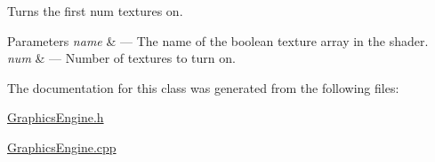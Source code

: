 Turns the first num textures on. 


\begin{DoxyParams}{Parameters}
{\em name} & --- The name of the boolean texture array in the shader.\\
\hline
{\em num} & --- Number of textures to turn on. \\
\hline
\end{DoxyParams}


The documentation for this class was generated from the following files\+:\begin{DoxyCompactItemize}
\item 
\hyperlink{_graphics_engine_8h}{Graphics\+Engine.\+h}\item 
\hyperlink{_graphics_engine_8cpp}{Graphics\+Engine.\+cpp}\end{DoxyCompactItemize}
